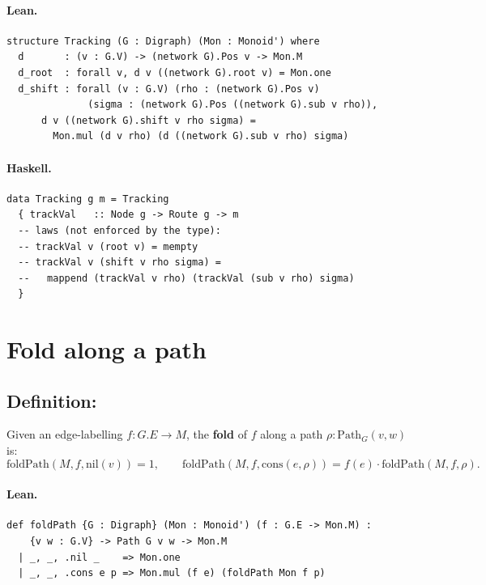 \documentclass[11pt,a4paper]{article}
\begin{document}
\paragraph{Lean.}
\begin{lstlisting}[style=lean]
structure Tracking (G : Digraph) (Mon : Monoid') where
  d       : (v : G.V) -> (network G).Pos v -> Mon.M
  d_root  : forall v, d v ((network G).root v) = Mon.one
  d_shift : forall (v : G.V) (rho : (network G).Pos v)
              (sigma : (network G).Pos ((network G).sub v rho)),
      d v ((network G).shift v rho sigma) =
        Mon.mul (d v rho) (d ((network G).sub v rho) sigma)
\end{lstlisting}

\paragraph{Haskell.}
\begin{lstlisting}[style=haskell]
data Tracking g m = Tracking
  { trackVal   :: Node g -> Route g -> m
  -- laws (not enforced by the type):
  -- trackVal v (root v) = mempty
  -- trackVal v (shift v rho sigma) =
  --   mappend (trackVal v rho) (trackVal (sub v rho) sigma)
  }
\end{lstlisting}


\section{Fold along a path}

\subsection{Definition: }

\begin{defn}
Given an edge-labelling $f : G.E \to M$, the \textbf{fold} of $f$ along a path
$\rho : \mathrm{Path}_G(v, w)$ is:
\[
  \mathrm{foldPath}(M, f, \mathrm{nil}(v)) = 1, \qquad
  \mathrm{foldPath}(M, f, \mathrm{cons}(e, \rho)) = f(e) \cdot \mathrm{foldPath}(M, f, \rho).
\]
\end{defn}

\paragraph{Lean.}
\begin{lstlisting}[style=lean]
def foldPath {G : Digraph} (Mon : Monoid') (f : G.E -> Mon.M) :
    {v w : G.V} -> Path G v w -> Mon.M
  | _, _, .nil _    => Mon.one
  | _, _, .cons e p => Mon.mul (f e) (foldPath Mon f p)
\end{lstlisting}
\end{document}
